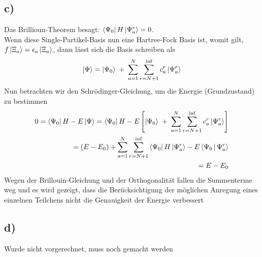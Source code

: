 \subsection{c)}
Das Brillioun-Theorem besagt: $\Bra{\Psi_0} H \Ket{\Psi_a^r} = 0$. \\
Wenn diese Single-Partikel-Basis nun eine Hartree-Fock Basis ist, womit gilt, $f \Ket{\Xi_a} = \epsilon_a \Ket{\Xi_a}$, dann l\"asst sich die Basis schreiben als
\begin{equation}
\Ket{\Psi} = \Ket{\Psi_0} \; + \; \sum_{a=1}^N \sum_{r=N+1}^{\inf} c_a^r \Ket{\Psi_a^r}
\end{equation}
Nun betrachten wir den Schr\"odinger-Gleichung, um die Energie (Grundzustand) zu bestimmen
\begin{align}
0 = \Bra{\Psi_0} H-E \Ket{\Psi} = \Bra{\Psi_0} H-E \left[ \Ket{\Psi_0} \; + \; \sum_{a=1}^N \sum_{r=N+1}^{\inf} c_a^r \Ket{\Psi_a^r} \right] \\
= \left(E-E_0 \right) + \sum_{a=1}^N \sum_{r=N+1}^{\inf} \Bra{\Psi_0} H \Ket{\Psi_a^r} - E \Braket{\Psi_0 | \Psi_a^r} \\
= E - E_0
\end{align}
Wegen der Brillouin-Gleichung und der Orthogonalit\"at fallen die Summenterme weg und es wird gezeigt, dass die Ber\"ucksichtigung der m\"oglichen Anregung eines einzelnen Teilchens nicht die Genauigkeit der Energie verbessert

\subsection{d)}

Wurde nicht vorgerechnet, muss noch gemacht werden
